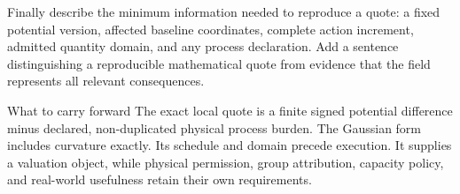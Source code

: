 Finally describe the minimum information needed to reproduce a quote: a fixed potential version, affected baseline coordinates, complete action increment, admitted quantity domain, and any process declaration. Add a sentence distinguishing a reproducible mathematical quote from evidence that the field represents all relevant consequences.

\begin{intuitionbox}{What to carry forward}
The exact local quote is a finite signed potential difference minus declared, non-duplicated physical process burden. The Gaussian form includes curvature exactly. Its schedule and domain precede execution. It supplies a valuation object, while physical permission, group attribution, capacity policy, and real-world usefulness retain their own requirements.
\end{intuitionbox}
